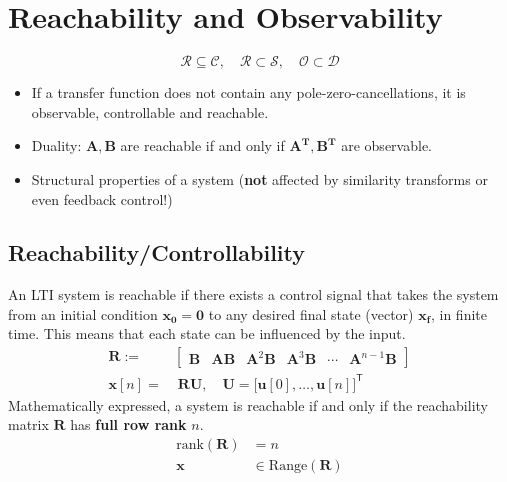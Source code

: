 \section{Reachability and Observability}
\noindent\begin{equation*}
    \mathcal{R} \subseteq \mathcal{C}, \quad \mathcal{R} \subset\mathcal{S}, \quad \mathcal{O} \subset \mathcal{D}
\end{equation*}


\begin{itemize}
    \item If a transfer function does not contain any pole-zero-cancellations, it is observable, controllable and reachable.
    \item Duality: $\mathbf{A},\mathbf{B}$ are reachable if and only if $\mathbf{A^T}, \mathbf{B^T}$ are observable.
    \item Structural properties of a system (\textbf{not} affected by similarity transforms or even feedback control!)
\end{itemize}

\subsection{Reachability/Controllability}

An LTI system is reachable if there exists a control signal that takes the system from an initial condition $\mathbf{x_0} = \mathbf{0}$ to any desired final state (vector) $\mathbf{x_f}$, in finite time. This means that each state can be influenced by the input.
\noindent\begin{align*}
    \mathbf{R} :=   & \begin{bmatrix}
                          \mathbf{B} & \mathbf{AB} & \mathbf{A}^2\mathbf{B} & \mathbf{A}^3\mathbf{B} & \cdots & \mathbf{A}^{n-1}\mathbf{B}
                      \end{bmatrix} \\
    \mathbf{x}[n] = & \; \mathbf{RU},\quad \mathbf{U}={\bigl[\mathbf{u}[0],\ldots, \mathbf{u}[n]\bigr]}^{\mathsf{T}}
\end{align*}
Mathematically expressed, a system is reachable if and only if the reachability matrix $\mathbf{R}$ has \textbf{full row rank} $n$.
\begin{align*}
    \text{rank}(\mathbf{R}) & = n                            \\
    \mathbf{x}    & \in \mathrm{Range}(\mathbf{R})
\end{align*}

